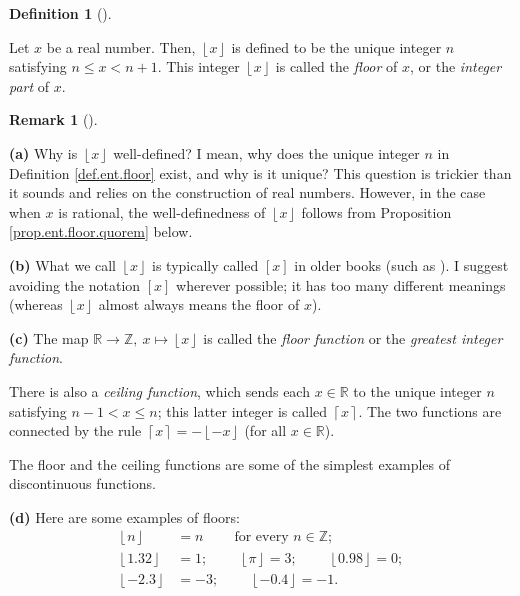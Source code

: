\documentclass[numbers=enddot,12pt,final,onecolumn,notitlepage]{scrartcl}%
\numberwithin{exer}{subsection}
\theoremstyle{definition}
\newtheorem{defi}[theo]{Definition}
\newenvironment{definition}[1][]
{\begin{defi}[#1]\begin{leftbar}}
{\end{leftbar}\end{defi}}
\newtheorem{remk}[theo]{Remark}
\newenvironment{remark}[1][]
{\begin{remk}[#1]\begin{leftbar}}
{\end{leftbar}\end{remk}}
\begin{document}
\begin{definition}
\label{def.ent.floor}Let $x$ be a real number. Then, $\left\lfloor
x\right\rfloor $ is defined to be the unique integer $n$ satisfying $n\leq
x<n+1$. This integer $\left\lfloor x\right\rfloor $ is called the
\textit{floor} of $x$, or the \textit{integer part} of $x$.
\end{definition}

\begin{remark}
\label{rmk.ent.floor}\textbf{(a)} Why is $\left\lfloor x\right\rfloor $
well-defined? I mean, why does the unique integer $n$ in Definition
\ref{def.ent.floor} exist, and why is it unique? This question is trickier
than it sounds and relies on the construction of real numbers. However, in the
case when $x$ is rational, the well-definedness of $\left\lfloor
x\right\rfloor $ follows from Proposition \ref{prop.ent.floor.quorem} below.

\textbf{(b)} What we call $\left\lfloor x\right\rfloor $ is typically called
$\left[  x\right]  $ in older books (such as \cite{NiZuMo91}). I suggest
avoiding the notation $\left[  x\right]  $ wherever possible; it has too many
different meanings (whereas $\left\lfloor x\right\rfloor $ almost always means
the floor of $x$).

\textbf{(c)} The map $\mathbb{R}\rightarrow\mathbb{Z},\ x\mapsto\left\lfloor
x\right\rfloor $ is called the \textit{floor function} or the \textit{greatest
integer function}.

There is also a \textit{ceiling function}, which sends each $x\in\mathbb{R}$
to the unique integer $n$ satisfying $n-1<x\leq n$; this latter integer is
called $\left\lceil x\right\rceil $. The two functions are connected by the
rule $\left\lceil x\right\rceil =-\left\lfloor -x\right\rfloor $ (for all
$x\in\mathbb{R}$).

The floor and the ceiling functions are some of the simplest examples of
discontinuous functions.

\textbf{(d)} Here are some examples of floors:%
\begin{align*}
\left\lfloor n\right\rfloor  &  =n\ \ \ \ \ \ \ \ \ \ \text{for every }%
n\in\mathbb{Z};\\
\left\lfloor 1.32\right\rfloor  &  =1;\ \ \ \ \ \ \ \ \ \ \left\lfloor
\pi\right\rfloor =3;\ \ \ \ \ \ \ \ \ \ \left\lfloor 0.98\right\rfloor =0;\\
\left\lfloor -2.3\right\rfloor  &  =-3;\ \ \ \ \ \ \ \ \ \ \left\lfloor
-0.4\right\rfloor =-1.
\end{align*}



\end{remark}
\end{document}
